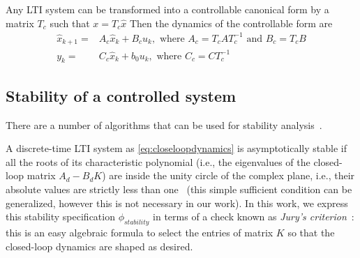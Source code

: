 \documentclass[a4paper,UKenglish]{lipics-v2018}
\newcommand{\mat}[1]{{#1}}
\renewcommand{\vec}[1]{{#1}}
\begin{document}
Any LTI system can be transformed into a controllable canonical form by a
matrix $\mat{T}_c$ such that $\vec{x}=\mat{T}_c\hat{\vec{x}}$ Then the
dynamics of the controllable form are
%
\begin{align*}
\hat{\vec{x}}_{k+1}=&\mat{A}_c\hat{\vec{x}}_k+\mat{B}_cu_k, \text{ where } \mat{A}_c=\mat{T}_c\mat{A}\mat{T}_c^{-1} \text{ and } \mat{B}_c=\mat{T}_c\mat{B}\\
y_k=&\mat{C}_c\hat{\vec{x}}_k + b_0u_k, \text{ where } \mat{C}_c=\mat{C}\mat{T}_c^{-1}\nonumber
\end{align*}
%

\subsection{Stability of a controlled system} 
\label{sec:closed_stability}
There are a number of algorithms that can be
used for stability analysis~\cite{daes20161,Bessa16}.

A discrete-time LTI system as \eqref{eq:closeloopdynamics} is asymptotically
stable if all the roots of its characteristic polynomial (i.e., the
eigenvalues of the closed-loop matrix $A_d - B_d K$) are inside the unity
circle of the complex plane, i.e., their absolute values are strictly less
than one~\cite{astrom1997computer} (this simple sufficient condition can be
generalized, however this is not necessary in our work).  In this work, we
express this stability specification $\phi_\mathit{stability}$ in terms of a
check known as \emph{Jury's criterion}~\cite{fadali}: this is an easy
algebraic formula to select the entries of matrix $K$ so that the
closed-loop dynamics are shaped as desired.
\end{document}
